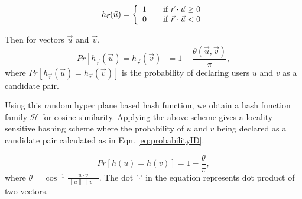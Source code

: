 \documentclass[conference]{IEEEtran}
\begin{document}
\begin{equation}
h_{\vec{r}}(\vec{u}) = \left\{ 
  \begin{array}{l l}
    1 & \quad \text{if  } \vec{r} \cdot \vec{u} \geq 0 \\
    0 & \quad \text{if  } \vec{r} \cdot \vec{u}  < 0
  \end{array} \right.
\label{eq:hashing}
\end{equation}

Then for vectors $\vec{u}$ and $\vec{v}$,
$$
 Pr[h_{\vec{r}}(\vec{u}) = h_{\vec{r}}(\vec{v})] = 
 1 - \frac{\theta(\vec{u},\vec{v})}{\pi},
$$
where $Pr[h_{\vec{r}}(\vec{u}) = h_{\vec{r}}(\vec{v})]$ is the probability 
of declaring users $u$ and $v$ as a candidate pair.

Using this random hyper plane based hash function, we obtain a hash function 
family $\mathcal{H}$ for cosine similarity. Applying the above scheme gives a 
locality sensitive hashing scheme where the probability of $u$ and $v$ being declared as a candidate pair calculated as in Eqn. \ref{eq:probabilityID}.

\begin{equation}
 Pr[h(u)=h(v)] = 1 - \frac{\theta}{\pi} ,
\label{eq:probabilityID}
\end{equation}
where $\theta = \cos^{-1} \frac{u \cdot v}{\parallel u \parallel \parallel v 
\parallel}$. The dot '$\cdot$' in the equation represents dot product of two 
vectors. 
\end{document}
